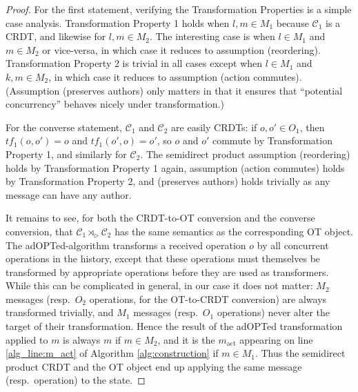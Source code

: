 \documentclass[acmsmall,nonacm]{acmart}
\newcommand{\mc}[1]{\ensuremath{\mathcal{#1}}}
\newcommand{\act}{\triangleright}
\theoremstyle{plain}
\theoremstyle{definition}
\begin{document}
\begin{proof}
For the first statement, verifying the Transformation Properties is a simple case analysis.  Transformation Property 1 holds when $l, m \in M_1$ because $\mc{C}_1$ is a CRDT, and likewise for $l, m \in M_2$.  The interesting case is when $l \in M_1$ and $m \in M_2$ or vice-versa, in which case it reduces to assumption (reordering).  Transformation Property 2 is trivial in all cases except when $l \in M_1$ and $k,m \in M_2$, in which case it reduces to assumption (action commutes).  (Assumption (preserves authors) only matters in that it ensures that ``potential concurrency'' behaves nicely under transformation.)

For the converse statement, $\mc{C}_1$ and $\mc{C}_2$ are easily CRDTs: if $o, o' \in O_1$, then $tf_1(o, o') = o$ and $tf_1(o', o) = o'$, so $o$ and $o'$ commute by Transformation Property 1, and similarly for $\mc{C}_2$.  The semidirect product assumption (reordering) holds by Transformation Property 1 again, assumption (action commutes) holds by Transformation Property 2, and (preserves authors) holds trivially as any message can have any author.

It remains to see, for both the CRDT-to-OT conversion and the converse conversion, that $\mc{C}_1 \rtimes_\act \mc{C}_2$ has the same semantics as the corresponding OT object.  The adOPTed-algorithm transforms a received operation $o$ by all concurrent operations in the history, except that these operations must themselves be transformed by appropriate operations before they are used as transformers.  While this can be complicated in general, in our case it does not matter: $M_2$ messages (resp.\ $O_2$ operations, for the OT-to-CRDT conversion) are always transformed trivially, and $M_1$ messages (resp.\ $O_1$ operations) never alter the target of their transformation.  Hence the result of the adOPTed transformation applied to $m$ is always $m$ if $m \in M_2$, and it is the $m_{\text{act}}$ appearing on line \ref{alg_line:m_act} of Algorithm \ref{alg:construction} if $m \in M_1$.  Thus the semidirect product CRDT and the OT object end up applying the same message (resp.\ operation) to the state. 
\end{proof}
\end{document}
